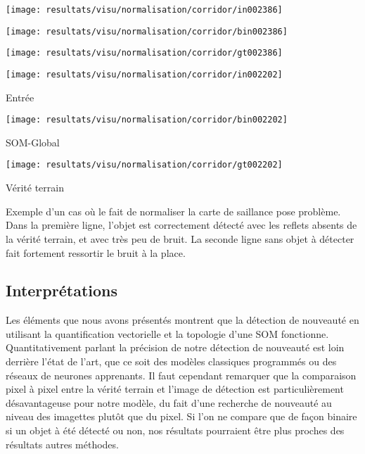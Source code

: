 	\begin{figureth}
		\begin{subfigureth}{.32\textwidth}
			\texttt{[image: resultats/visu/normalisation/corridor/in002386]}
		\end{subfigureth}
		\begin{subfigureth}{.32\textwidth}
			\texttt{[image: resultats/visu/normalisation/corridor/bin002386]}
		\end{subfigureth}
		\begin{subfigureth}{.32\textwidth}
			\texttt{[image: resultats/visu/normalisation/corridor/gt002386]}
		\end{subfigureth}

		\begin{subfigureth}{.32\textwidth}
			\texttt{[image: resultats/visu/normalisation/corridor/in002202]} \caption{Entrée}
		\end{subfigureth}
		\begin{subfigureth}{.32\textwidth}
			\texttt{[image: resultats/visu/normalisation/corridor/bin002202]} \caption{SOM-Global}
		\end{subfigureth}
		\begin{subfigureth}{.32\textwidth}
			\texttt{[image: resultats/visu/normalisation/corridor/gt002202]} \caption{Vérité terrain}
		\end{subfigureth}

		\caption[Visualisation des effets de la normalisation]{Exemple d'un cas où le fait de normaliser la carte de saillance pose problème. Dans la première ligne, l'objet est correctement détecté avec les reflets absents de la vérité terrain, et avec très peu de bruit. La seconde ligne sans objet à détecter fait fortement ressortir le bruit à la place.}\label{fig:res:visu-normalisation}
	\end{figureth}

	\subsection{Interprétations}

	Les éléments que nous avons présentés montrent que la détection de nouveauté en utilisant la quantification vectorielle et la topologie d'une SOM fonctionne. Quantitativement parlant la précision de notre détection de nouveauté est loin derrière l'état de l'art, que ce soit des modèles classiques programmés ou des réseaux de neurones apprenants. Il faut cependant remarquer que la comparaison pixel à pixel entre la vérité terrain et l'image de détection est particulièrement désavantageuse pour notre modèle, du fait d'une recherche de nouveauté au niveau des imagettes plutôt que du pixel. Si l'on ne compare que de façon binaire si un objet à été détecté ou non, nos résultats pourraient être plus proches des résultats autres méthodes.
	
